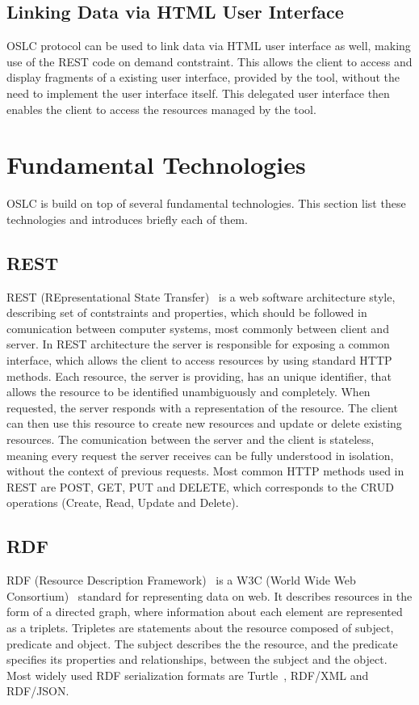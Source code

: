 \subsection*{Linking Data via HTML User Interface}
\label {sec:oslc_linking_data_via_html_user_interface}
OSLC protocol can be used to link data via HTML user interface as well, making use of the REST code on demand contstraint. This allows the client to access and display fragments of a existing user interface, provided by the tool, without the need to implement the user interface itself. This delegated user interface then enables the client to access the resources managed by the tool.

\section{Fundamental Technologies}
\label {sec:oslc_fundamental_technologies}
OSLC is build on top of several fundamental technologies. This section list these technologies and introduces briefly each of them.

\subsection*{REST}
REST (REpresentational State Transfer) \cite{rest} is a web software architecture style, describing set of contstraints and properties, which should be followed in comunication between computer systems, most commonly between client and server. In REST architecture the server is responsible for exposing a common interface, which allows the client to access resources by using standard HTTP methods. Each resource, the server is providing, has an unique identifier, that allows the resource to be identified unambiguously and completely. When requested, the server responds with a representation of the resource. The client can then use this resource to create new resources and update or delete existing resources. The comunication between the server and the client is stateless, meaning every request the server receives can be fully understood in isolation, without the context of previous requests. Most common HTTP methods used in REST are POST, GET, PUT and DELETE, which corresponds to the CRUD operations (Create, Read, Update and Delete).

\subsection*{RDF}
RDF (Resource Description Framework) \cite{rdf} is a W3C (World Wide Web Consortium) \cite{w3c} standard for representing data on web. It describes resources in the form of a directed graph, where information about each element are represented as a triplets. Tripletes are statements about the resource composed of subject, predicate and object. The subject describes the the resource, and the predicate specifies its properties and relationships, between the subject and the object. Most widely used RDF serialization formats are Turtle \cite{turtle}, RDF/XML and RDF/JSON.

